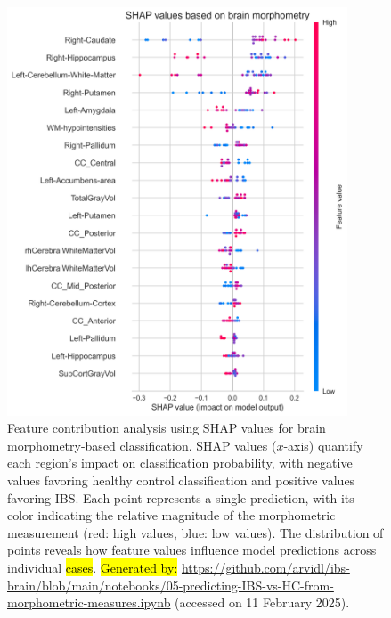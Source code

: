 \documentclass[diagnostics,article,accept,pdftex,moreauthors]{Definitions/mdpi}
\begin{document}
\begin{figure}[H]
\includegraphics[width=0.90\textwidth]{figs/SHAP_summary_plot_IBS_brain_morphometry.png}
\caption{{{Feature contribution analysis using SHAP values for brain morphometry-based classification}}. SHAP values ($x$-axis) quantify each region's impact on classification probability, with negative values favoring healthy control classification and positive values favoring IBS. Each point represents a single prediction, with its color indicating the relative magnitude of the morphometric measurement (red: high values, blue: low values). The distribution of points reveals how feature values influence model predictions across individual \hl{cases}. %
{\hl{Generated by:} {{\url{https://github.com/arvidl/ibs-brain/blob/main/notebooks/05-predicting-IBS-vs-HC-from-morphometric-measures.ipynb}}}} (accessed on 11 February 2025).}
\label{fig:SHAP-values}
\end{figure} 
\end{document}
